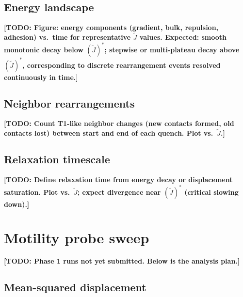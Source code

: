\documentclass[aps,pre,twocolumn,superscriptaddress,longbibliography]{revtex4-2}
\newcommand{\Jk}{\tilde{J}}                %
\newcommand{\todo}[1]{{\color{red}\textbf{[TODO: #1]}}}
\begin{document}
\subsection{Energy landscape}
\label{sec:quench:energy}

\todo{Figure: energy components (gradient, bulk, repulsion, adhesion) vs.\
time for representative $\Jk$ values.  Expected: smooth monotonic decay
below $(\Jk)^*$; stepwise or multi-plateau decay above $(\Jk)^*$,
corresponding to discrete rearrangement events resolved continuously
in time.}

\subsection{Neighbor rearrangements}
\label{sec:quench:topology}

\todo{Count T1-like neighbor changes (new contacts formed, old contacts lost)
between start and end of each quench.  Plot vs.\ $\Jk$.}

\subsection{Relaxation timescale}
\label{sec:quench:timescale}

\todo{Define relaxation time from energy decay or displacement saturation.
Plot vs.\ $\Jk$; expect divergence near $(\Jk)^*$ (critical slowing down).}


\section{Motility probe sweep}
\label{sec:motility}


\todo{Phase 1 runs not yet submitted.  Below is the analysis plan.}

\subsection{Mean-squared displacement}
\label{sec:motility:msd}
\end{document}

